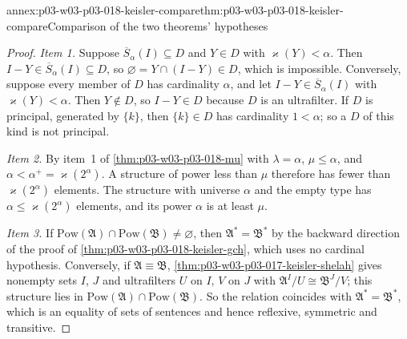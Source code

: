 \begin{annexitem}{annex:p03-w03-p03-018-keisler-compare}{thm:p03-w03-p03-018-keisler-compare}{Comparison of the two theorems' hypotheses}
\begin{proof}
\emph{Item 1.}  Suppose \(\overline S_\alpha(I)\subseteq D\) and
\(Y\in D\) with \(\varkappa(Y)<\alpha\).  Then \(I-Y\in\overline
S_\alpha(I)\subseteq D\), so \(\varnothing=Y\cap(I-Y)\in D\), which is
impossible.  Conversely, suppose every member of \(D\) has cardinality
\(\alpha\), and let \(I-Y\in\overline S_\alpha(I)\) with
\(\varkappa(Y)<\alpha\).  Then \(Y\notin D\), so \(I-Y\in D\) because \(D\)
is an ultrafilter.  If \(D\) is principal, generated by \(\{k\}\), then
\(\{k\}\in D\) has cardinality \(1<\alpha\); so a \(D\) of this kind is not
principal.

\emph{Item 2.}  By item~1 of \cref{thm:p03-w03-p03-018-mu} with
\(\lambda=\alpha\), \(\mu\le\alpha\), and \(\alpha<\alpha^+=
\varkappa(2^\alpha)\).  A structure of power less than \(\mu\) therefore has
fewer than \(\varkappa(2^\alpha)\) elements.  The structure with universe
\(\alpha\) and the empty type has \(\alpha\le\varkappa(2^\alpha)\) elements,
and its power \(\alpha\) is at least \(\mu\).

\emph{Item 3.}  If \(\mathrm{Pow}(\mathfrak A)\cap\mathrm{Pow}(\mathfrak
B)\ne\varnothing\), then \(\mathfrak A^*=\mathfrak B^*\) by the backward
direction of the proof of \cref{thm:p03-w03-p03-018-keisler-gch}, which
uses no cardinal hypothesis.  Conversely, if \(\mathfrak A\equiv\mathfrak
B\), \cref{thm:p03-w03-p03-017-keisler-shelah} gives nonempty sets \(I\),
\(J\) and ultrafilters \(U\) on \(I\), \(V\) on \(J\) with
\(\mathfrak A^I/U\cong\mathfrak B^J/V\); this structure lies in
\(\mathrm{Pow}(\mathfrak A)\cap\mathrm{Pow}(\mathfrak B)\).  So the relation
coincides with \(\mathfrak A^*=\mathfrak B^*\), which is an equality of sets
of sentences and hence reflexive, symmetric and transitive.
\end{proof}
\end{annexitem}

